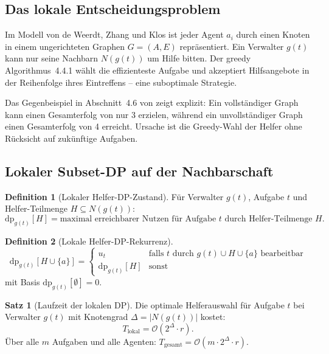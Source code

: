 ﻿\documentclass[a4paper,12pt]{article}
\theoremstyle{definition}
\newtheorem{definition}{Definition}
\newtheorem{satz}{Satz}
\begin{document}
\subsection{Das lokale Entscheidungsproblem}

Im Modell von de Weerdt, Zhang und Klos \cite{dwzk07} ist jeder Agent $a_i$
durch einen Knoten in einem ungerichteten Graphen $G = (A, E)$ repr\"{a}sentiert.
Ein Verwalter $g(t)$ kann nur seine Nachbarn $N(g(t))$ um Hilfe bitten.
Der greedy Algorithmus~4.4.1 w\"{a}hlt die effizienteste Aufgabe und akzeptiert
Hilfsangebote in der Reihenfolge ihres Eintreffens -- eine suboptimale Strategie.

Das Gegenbeispiel in Abschnitt~4.6 von \cite{sk98} zeigt explizit: Ein
vollst\"{a}ndiger Graph kann einen Gesamterfolg von nur 3 erzielen, w\"{a}hrend
ein unvollst\"{a}ndiger Graph einen Gesamterfolg von 4 erreicht. Ursache ist die
Greedy-Wahl der Helfer ohne R\"{u}cksicht auf zuk\"{u}nftige Aufgaben.

\subsection{Lokaler Subset-DP auf der Nachbarschaft}

\begin{definition}[Lokaler Helfer-DP-Zustand]
    F\"{u}r Verwalter $g(t)$, Aufgabe $t$ und Helfer-Teilmenge $H \subseteq N(g(t))$:
    \[
        \mathrm{dp}_{g(t)}[H] = \text{maximal erreichbarer Nutzen f\"{u}r Aufgabe }
        t \text{ durch Helfer-Teilmenge } H.
    \]
\end{definition}

\begin{definition}[Lokale Helfer-DP-Rekurrenz]
    \begin{equation}
        \mathrm{dp}_{g(t)}[H \cup \{a\}] =
        \begin{cases}
            u_t & \text{falls } t \text{ durch } g(t) \cup H \cup \{a\} \text{ bearbeitbar}\\
            \mathrm{dp}_{g(t)}[H] & \text{sonst}
        \end{cases}
        \label{eq:local_dp}
    \end{equation}
    mit Basis $\mathrm{dp}_{g(t)}[\emptyset] = 0$.
\end{definition}

\begin{satz}[Laufzeit der lokalen DP]
    \label{satz:local_dp}
    Die optimale Helferauswahl f\"{u}r Aufgabe $t$ bei Verwalter $g(t)$
    mit Knotengrad $\Delta = |N(g(t))|$ kostet:
    \[
        T_{\mathrm{lokal}} = \mathcal{O}(2^\Delta \cdot r).
    \]
    \"{U}ber alle $m$ Aufgaben und alle Agenten:
    $T_{\mathrm{gesamt}} = \mathcal{O}(m \cdot 2^\Delta \cdot r)$.
\end{satz}
\end{document}
